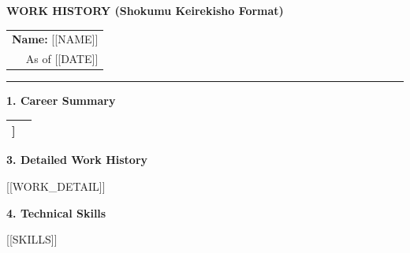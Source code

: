 \documentclass[10pt,a4paper]{article}
\begin{document}
{\large\textbf{WORK HISTORY (Shokumu Keirekisho Format)}}\hfill
\begin{tabular}{r}
\textbf{Name:} [[NAME]] \\ As of [[DATE]] \\
\end{tabular}
\vspace{3pt}\hrule\vspace{8pt}

\textbf{1. Career Summary}
\begin{center}
\begin{tabularx}{\textwidth}{|>{\raggedright\arraybackslash}p{3.4cm}|X|}
\hline
[[SUMMARY_ROWS]] \\ \hline
\end{tabularx}
\end{center}

\vspace{4pt}

\vspace{8pt}
\textbf{3. Detailed Work History}

\vspace{4pt}
[[WORK_DETAIL]]

\vspace{8pt}
\textbf{4. Technical Skills}

\vspace{2pt}
[[SKILLS]]
\end{document}
